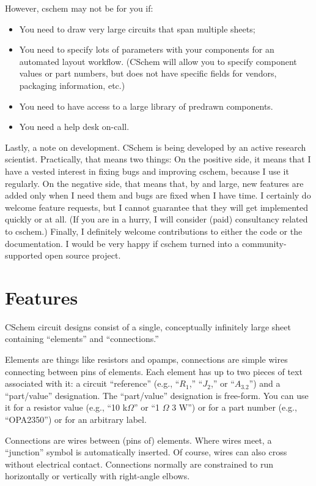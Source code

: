\documentclass[11pt]{report}
\def\Ohm{$\Omega$}
\begin{document}
\noindent However, cschem may not be for you if:
\begin{itemize}
  \item You need to draw very large circuits that span multiple
    sheets;
  \item You need to specify lots of parameters with your components
    for an automated layout workflow. (CSchem will allow you to
    specify component values or part numbers, but does not have
    specific fields for vendors, packaging information, etc.)
  \item You need to have access to a large library of predrawn components.
  \item You need a help desk on-call.
\end{itemize}
\noindent Lastly, a note on development. CSchem is being developed by an
active research scientist. Practically, that means two things: On the
positive side, it means that I have a vested interest in fixing bugs
and improving cschem, because I use it regularly. On the negative side, that
means that, by and large, new features are added only when I need them
and bugs are fixed when I have time. I certainly do welcome feature
requests, but I cannot guarantee that they will get implemented
quickly or at all. (If you are in a hurry, I will consider (paid)
consultancy related to cschem.) Finally, I definitely welcome
contributions to either the code or the documentation. I would be very
happy if cschem turned into a community-supported open source project.

\section{Features}

CSchem circuit designs consist of a single, conceptually infinitely
large sheet containing ``elements'' and ``connections.''

Elements are things like resistors and opamps, connections are simple
wires connecting between pins of elements. Each element has up to two
pieces of text associated with it: a circuit ``reference'' (e.g.,
``$R_1$,'' ``$J_2$,'' or ``$A_{3.2}$'') and a ``part/value''
designation. The ``part/value'' designation is free-form. You can use
it for a resistor value (e.g., ``10 k\Ohm'' or ``1 \Ohm{} 3 W'') or
for a part number (e.g., ``OPA2350'') or for an arbitrary
label.

Connections are wires between (pins of) elements. Where wires meet, a
``junction'' symbol is automatically inserted. Of course, wires can
also cross without electrical contact. Connections normally are
constrained to run horizontally or vertically with right-angle elbows.
\end{document}
